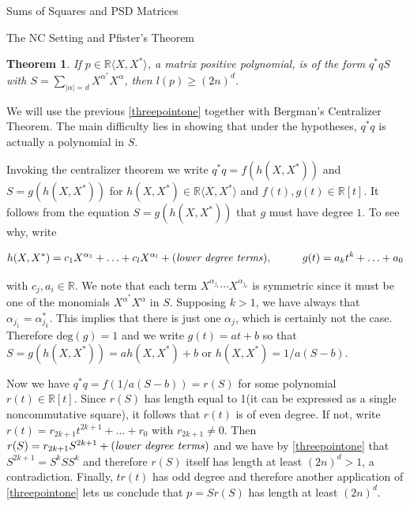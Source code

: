 \documentclass[12pt,oneside,final]{ucthesisucsbmath2010}
\newcommand{\R}{\mathbb{R}}
\newtheorem{thm}{Theorem}[section]
\theoremstyle{definition}
\begin{document}
\begin{chapter}{Sums of Squares and PSD Matrices}
\begin{section}{The NC Setting and Pfister's Theorem}
\begin{thm}

If $p \in \R\langle X, X^*\rangle$, a matrix positive polynomial, is of the form $q^*qS$ with $S=\sum_{|\alpha|=d} X^{\alpha^*}X^\alpha$, then $l(p) \geq (2n)^d$. 
\end{thm}
\proof We will use the previous \ref{threepointone} together with Bergman's Centralizer Theorem.  The main difficulty lies in showing that under the hypotheses, $q^*q$ is actually a polynomial in $S$.

Invoking the centralizer theorem we write $q^*q=f(h(X,X^*))$ and $S=g(h(X,X^*))$ for $h(X,X^*) \in \R\langle X,X^*\rangle$ and $f(t),g(t) \in \R[t]$. It follows from the equation $S=g(h(X,X^*))$ that $g$ must have degree $1$.  To see why, write 

\[h(X,X^*)=c_1X^{\alpha_1}+\ldots+c_lX^{\alpha_l}+(\text{\emph{lower degree terms}}), \hspace{1cm}g(t)=a_kt^k+\ldots+a_0\]

with $c_j,a_i \in \R$. We note that each term $X^{\alpha_{j_1}}\cdots X^{\alpha_{j_k}}$ is symmetric since it must be one of the monomials $X^{\alpha^*}X^\alpha$ in $S$. Supposing $k>1$, we have always that $\alpha_{j_1}=\alpha_{j_k}^*$. This implies that there is just one $\alpha_j$, which is certainly not the case.  Therefore $\text{deg}(g)=1$ and we write $g(t)=at+b$ so that $S=g(h(X,X^*))=ah(X,X^*)+b$ or $h(X,X^*)=1\slash a(S-b)$.

Now we have $q^*q=f(1\slash a (S-b))=r(S)$ for some polynomial $r(t)\in \R[t]$.  Since $r(S)$ has length equal to 1(it can be expressed as a single noncommutative square), it follows that $r(t)$ is of even degree.  If not, write $r(t)=r_{2k+1}t^{2k+1}+\ldots +r_0$ with $r_{2k+1}\neq0$. Then $r(S)=r_{2k+1}S^{2k+1}+(\text{\emph{lower degree terms}})$ and we have by \ref{threepointone} that $S^{2k+1}=S^kSS^k$ and therefore $r(S)$ itself has length at least $(2n)^d>1$, a contradiction.  Finally, $tr(t)$ has odd degree and therefore another application of \ref{threepointone} lets us conclude that $p=Sr(S)$ has length at least $(2n)^d$.\endproof 

\label{NCPfister}

\end{section}
\label{ch2}
\end{chapter}


\end{document}
